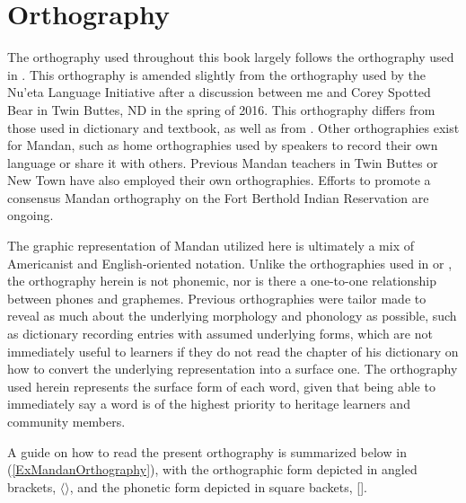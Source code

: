 \section{Orthography}\label{SecOrthography}
\largerpage
The orthography used throughout this book largely follows the orthography used in \citet{kasak2014}. This orthography is amended slightly from the orthography used by the Nu'eta Language Initiative after a discussion between me and Corey Spotted Bear in Twin Buttes, ND in the spring of 2016. This orthography differs from those used in  dictionary and  textbook, as well as from \citet{mixco1997a,mixco1997b}. Other orthographies exist for Mandan, such as home orthographies used by speakers to record their own language or share it with others. Previous Mandan teachers in Twin Buttes or New Town have also employed their own orthographies. Efforts to promote a consensus Mandan orthography on the Fort Berthold Indian Reservation are ongoing.

The graphic representation of Mandan utilized here is ultimately a mix of Americanist and English-oriented notation. Unlike the orthographies used in \citet{hollow1970} or \citet{mixco1997a}, the orthography herein is not phonemic, nor is there a one-to-one relationship between phones and graphemes. Previous orthographies were tailor made to reveal as much about the underlying morphology and phonology as possible, such as  dictionary recording entries with assumed underlying forms, which are not immediately useful to learners if they do not read the chapter of his dictionary on how to convert the underlying representation into a surface one. The orthography used herein represents the surface form of each word, given that being able to immediately say a word is of the highest priority to heritage learners and community members.

A guide on how to read the present orthography is summarized below in (\ref{ExMandanOrthography}), with the orthographic form depicted in angled brackets, $\langle\rangle$, and the phonetic form depicted in square backets, [].

